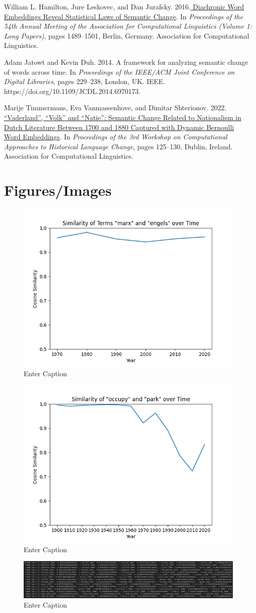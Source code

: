 \documentclass[11pt]{article}
\begin{document}
William L. Hamilton, Jure Leskovec, and Dan Jurafsky. 2016.\href{https://aclanthology.org/P16-1141}{ Diachronic Word Embeddings Reveal Statistical Laws of Semantic Change}. In \textit{Proceedings of the 54th Annual Meeting of the Association for Computational Linguistics (Volume 1: Long Papers)}, pages 1489–1501, Berlin, Germany. Association for Computational Linguistics.

Adam Jatowt and Kevin Duh. 2014. A framework for analyzing semantic change of words across time. In \textit{Proceedings of the IEEE/ACM Joint Conference on Digital Libraries}, pages 229–238, London, UK. IEEE. https://doi.org/10.1109/JCDL.2014.6970173.

Marije Timmermans, Eva Vanmassenhove, and Dimitar Shterionov. 2022.\href{https://aclanthology.org/2022.lchange-1.13}{ “Vaderland”, “Volk” and “Natie”: Semantic Change Related to Nationalism in Dutch Literature Between 1700 and 1880 Captured with Dynamic Bernoulli Word Embeddings}. In \textit{Proceedings of the 3rd Workshop on Computational Approaches to Historical Language Change}, pages 125–130, Dublin, Ireland. Association for Computational Linguistics.


\section*{Figures/Images}
\begin{figure}
    \centering
    \includegraphics[width=0.5\linewidth]{marx-engels.png}
    \caption{Enter Caption}
    \label{Figure 1}
\end{figure}
\begin{figure}
    \centering
    \includegraphics[width=0.5\linewidth]{occupy-park.png}
    \caption{Enter Caption}
    \label{fig:enter-label}
\end{figure}
\begin{figure}
    \centering
    \includegraphics[width=0.5\linewidth]{spanish.png}
    \caption{Enter Caption}
    \label{fig:enter-label}
\end{figure}
\end{document}
